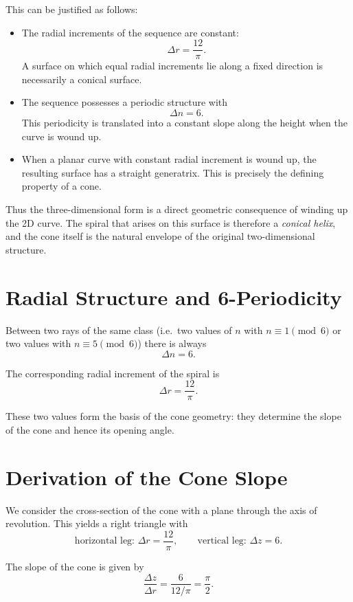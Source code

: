 This can be justified as follows:

\begin{itemize}
  \item The radial increments of the sequence are constant:
  \[
  \Delta r = \frac{12}{\pi}.
  \]
  A surface on which equal radial increments lie along a fixed direction is
  necessarily a conical surface.

  \item The sequence possesses a periodic structure with
  \[
  \Delta n = 6.
  \]
  This periodicity is translated into a constant slope along the height when
  the curve is wound up.

  \item When a planar curve with constant radial increment is wound up, the
  resulting surface has a straight generatrix. This is precisely the defining
  property of a cone.
\end{itemize}

Thus the three-dimensional form is a direct geometric consequence of winding
up the 2D curve. The spiral that arises on this surface is therefore a
\emph{conical helix}, and the cone itself is the natural envelope of the
original two-dimensional structure.

\section{Radial Structure and 6-Periodicity}

Between two rays of the same class (i.e.\ two values of $n$ with
$n \equiv 1 \pmod{6}$ or two values with $n \equiv 5 \pmod{6}$) there is
always
\[
\Delta n = 6.
\]

The corresponding radial increment of the spiral is
\[
\Delta r = \frac{12}{\pi}.
\]

These two values form the basis of the cone geometry: they determine the
slope of the cone and hence its opening angle.

\section{Derivation of the Cone Slope}

We consider the cross-section of the cone with a plane through the axis of
revolution. This yields a right triangle with
\[
\text{horizontal leg: } \Delta r = \frac{12}{\pi}, \qquad
\text{vertical leg: } \Delta z = 6.
\]

The slope of the cone is given by
\[
\frac{\Delta z}{\Delta r}
= \frac{6}{12/\pi}
= \frac{\pi}{2}.
\]

